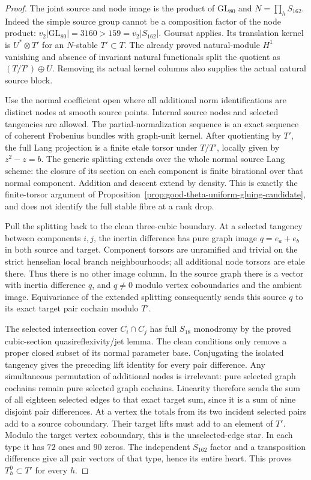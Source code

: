 \begin{proof}
The joint source and node image is the product of
$\mathrm{GL}_{80}$ and $N=\prod_hS_{162}$. Indeed the simple source
group cannot be a composition factor of the node product:
$v_2|\mathrm{GL}_{80}|=3160>159=v_2|S_{162}|$.
Goursat applies. Its translation kernel is $U^*\otimes T'$ for
an $N$-stable $T'\subset T$. The already proved natural-module
$H^1$ vanishing and absence of invariant natural functionals split
the quotient as $(T/T')\oplus U$. Removing its actual kernel
columns also supplies the actual natural source block.

Use the normal coefficient open where all additional norm
identifications are distinct nodes at smooth source points.
Internal source nodes and selected tangencies are allowed.
The partial-normalization sequence is an exact sequence of
coherent Frobenius bundles with graph-unit kernel. After quotienting
by $T'$, the full Lang projection is a finite etale torsor under
$T/T'$, locally given by $z^2-z=b$. The generic splitting extends
over the whole normal source Lang scheme: the closure of its
section on each component is finite birational over that normal
component. Addition and descent extend by density. This is exactly
the finite-torsor argument of
Proposition~\ref{prop:good-theta-uniform-gluing-candidate}, and
does not identify the full stable fibre at a rank drop.

Pull the splitting back to the clean three-cubic boundary.
At a selected tangency between components $i,j$, the inertia
difference has pure graph image
$q=e_a+e_b$ in both source and target. Component torsors are
unramified and trivial on the strict henselian local branch
neighbourhoods; all additional node torsors are etale there.
Thus there is no other image column. In the source graph there
is a vector with inertia difference $q$, and $q\ne0$ modulo
vertex coboundaries and the ambient image. Equivariance of the
extended splitting consequently sends this source $q$ to its
exact target pair cochain modulo $T'$.

The selected intersection cover $C_i\cap C_j$ has full $S_{18}$
monodromy by the proved cubic-section quasireflexivity/jet lemma.
The clean conditions only remove a proper closed subset of its
normal parameter base. Conjugating the isolated tangency gives
the preceding lift identity for every pair difference. Any
simultaneous permutation of additional nodes is irrelevant:
pure selected graph cochains remain pure selected graph cochains.
Linearity therefore sends the sum of all eighteen selected edges
to that exact target sum, since it is a sum of nine disjoint pair
differences. At a vertex the totals from its two incident selected
pairs add to a source coboundary. Their target lifts must add to
an element of $T'$. Modulo the target vertex coboundary, this is
the unselected-edge star. In each type it has $72$ ones and $90$
zeros. The independent $S_{162}$ factor and a transposition
difference give all pair vectors of that type, hence its entire
heart. This proves $T_h^0\subset T'$ for every $h$.
\end{proof}

